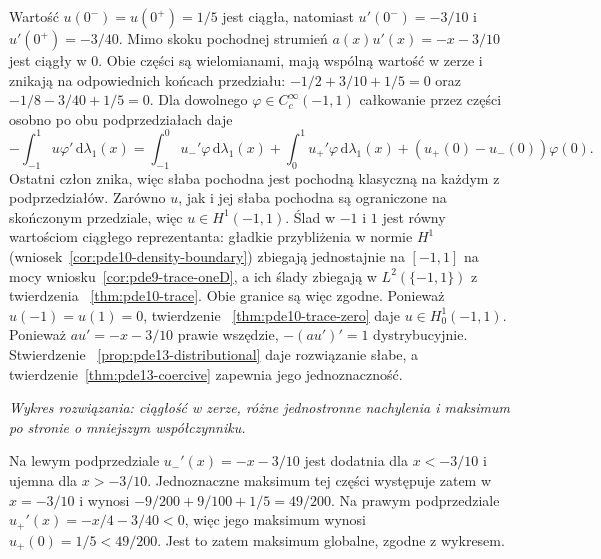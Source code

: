 Wartość $u(0^-)=u(0^+)=1/5$ jest ciągła, natomiast
$u'(0^-)=-3/10$ i $u'(0^+)=-3/40$. Mimo skoku pochodnej
strumień $a(x)u'(x)=-x-3/10$ jest ciągły w $0$.
Obie części są wielomianami, mają wspólną wartość w zerze
i znikają na odpowiednich końcach przedziału:
$-1/2+3/10+1/5=0$ oraz $-1/8-3/40+1/5=0$.
Dla dowolnego $\varphi\in C_c^\infty(-1,1)$ całkowanie
przez części osobno po obu podprzedziałach daje
\[
 -\int_{-1}^1u\varphi'\,\mathrm d\lambda_1(x)
 =\int_{-1}^0u_-'\varphi\,\mathrm d\lambda_1(x)
 +\int_0^1u_+'\varphi\,\mathrm d\lambda_1(x)
 +(u_+(0)-u_-(0))\varphi(0).
\]
Ostatni człon znika, więc słaba pochodna jest pochodną
klasyczną na każdym z podprzedziałów.
Zarówno $u$, jak i jej słaba pochodna są ograniczone
na skończonym przedziale, więc $u\in H^1(-1,1)$.
Ślad w $-1$ i $1$ jest równy wartościom ciągłego
reprezentanta: gładkie przybliżenia w normie $H^1$
(wniosek~\ref{cor:pde10-density-boundary}) zbiegają jednostajnie
na $[-1,1]$ na mocy wniosku~\ref{cor:pde9-trace-oneD},
a ich ślady zbiegają w $L^2(\{-1,1\})$ z twierdzenia
~\ref{thm:pde10-trace}. Obie granice są więc zgodne.
Ponieważ $u(-1)=u(1)=0$, twierdzenie
~\ref{thm:pde10-trace-zero} daje $u\in H_0^1(-1,1)$.
Ponieważ $au'=-x-3/10$ prawie wszędzie,
$-(au')'=1$ dystrybucyjnie. Stwierdzenie
~\ref{prop:pde13-distributional} daje rozwiązanie słabe,
a twierdzenie~\ref{thm:pde13-coercive} zapewnia jego jednoznaczność.

\begin{center}

\small\emph{Wykres rozwiązania: ciągłość w zerze, różne jednostronne
nachylenia i maksimum po stronie o mniejszym współczynniku.}
\end{center}

Na lewym podprzedziale $u_-'(x)=-x-3/10$ jest dodatnia
dla $x<-3/10$ i ujemna dla $x>-3/10$.
Jednoznaczne maksimum tej części występuje zatem w
$x=-3/10$ i wynosi
$-9/200+9/100+1/5=49/200$.
Na prawym podprzedziale $u_+'(x)=-x/4-3/40<0$,
więc jego maksimum wynosi $u_+(0)=1/5<49/200$.
Jest to zatem maksimum globalne, zgodne z wykresem.

